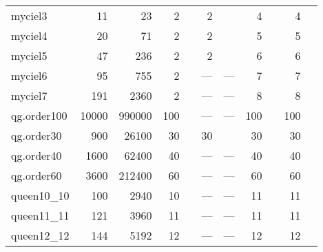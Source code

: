 \begin{longtable}{lrrrlrlrlrl}
  myciel3 & 11 & 23 & 2 & \cite{Malaguti2011,Gualandi2012} & 2 & \cite{Gualandi2012} & 4 & \cite{Mehrotra1996,Gualandi2012} & 4 & \cite{Mehrotra1996,Wu2013a,Gualandi2012,Zhou2016} \\ 
  myciel4 & 20 & 71 & 2 & \cite{Malaguti2011} & 2 & \cite{Gualandi2012} & 5 & \cite{Mehrotra1996,Gualandi2012} & 5 & \cite{Mehrotra1996,Wu2013a,Gualandi2012,Zhou2016} \\ 
  myciel5 & 47 & 236 & 2 & \cite{Malaguti2011} & 2 & \cite{Gualandi2012} & 6 & \cite{Mehrotra1996,Gualandi2012} & 6 & \cite{Mehrotra1996,Wu2013a,Gualandi2012,Zhou2016} \\ 
  myciel6 & 95 & 755 & 2 & \cite{Malaguti2011} & --- & --- & 7 & \cite{Malaguti2010,Malaguti2011} & 7 & \cite{Malaguti2010,Malaguti2011,Wu2013a,Gualandi2012,Mendez-Diaz2006,Brelaz1979,Sewell1996,Segundo2012,Zhou2016} \\ 
  myciel7 & 191 & 2360 & 2 & \cite{Malaguti2011} & --- & --- & 8 & \cite{Malaguti2010,Malaguti2011} & 8 & \cite{Malaguti2010,Malaguti2011,Wu2013a,Gualandi2012,Mendez-Diaz2006,Brelaz1979,Sewell1996,Segundo2012,Zhou2016} \\ 
  qg.order100 & 10000 & 990000 & 100 & \cite{us} & --- & --- & 100 & \cite{Gomes2002} & 100 & \cite{Gomes2002} \\ 
  qg.order30 & 900 & 26100 & 30 & \cite{Malaguti2011,Gualandi2012} & 30 & \cite{Gualandi2012} & 30 & \cite{Mendez-Diaz2006,Malaguti2011,Gualandi2012} & 30 & \cite{Mendez-Diaz2006,Malaguti2011,Wu2013a,Gualandi2012,Brelaz1979,Segundo2012,Sewell1996} \\ 
  qg.order40 & 1600 & 62400 & 40 & \cite{Malaguti2011} & --- & --- & 40 & \cite{Malaguti2010,Mendez-Diaz2006,Malaguti2011} & 40 & \cite{Malaguti2010,Malaguti2011,Wu2013a,Segundo2012,Sewell1996} \\ 
  qg.order60 & 3600 & 212400 & 60 & \cite{Malaguti2011} & --- & --- & 60 & \cite{Malaguti2010,Mendez-Diaz2006,Malaguti2011} & 60 & \cite{Malaguti2010,Malaguti2011,Wu2013a,Sewell1996} \\ 
  queen10\_10 & 100 & 2940 & 10 & \cite{Malaguti2011} & --- & --- & 11 & \cite{Malaguti2010,Malaguti2011} & 11 & \cite{Malaguti2010,Malaguti2011,Gualandi2012,Zhou2016} \\ 
  queen11\_11 & 121 & 3960 & 11 & \cite{Malaguti2011} & --- & --- & 11 & \cite{Malaguti2010,Malaguti2011,Gualandi2012,Mendez-Diaz2006} & 11 & \cite{Malaguti2010,Malaguti2011,Gualandi2012} \\ 
  queen12\_12 & 144 & 5192 & 12 & \cite{Malaguti2011} & --- & --- & 12 & \cite{Malaguti2010,Malaguti2011,Mendez-Diaz2006} & 12 & \cite{Malaguti2010,Malaguti2011} \\ 

\end{longtable}
